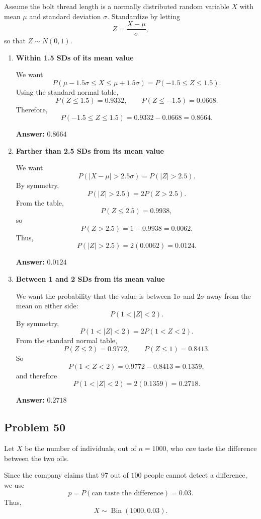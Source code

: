 \documentclass[11pt]{article}
\begin{document}
Assume the bolt thread length is a normally distributed random variable $X$ with mean $\mu$ and standard deviation $\sigma$. Standardize by letting
\[
Z=\frac{X-\mu}{\sigma},
\]
so that $Z\sim N(0,1)$.

\begin{enumerate}
    \item[(a)] \textbf{Within 1.5 SDs of its mean value}

    We want
    \[
    P(\mu-1.5\sigma \le X \le \mu+1.5\sigma)
    =P(-1.5\le Z\le 1.5).
    \]
    Using the standard normal table,
    \[
    P(Z\le 1.5)=0.9332,\qquad P(Z\le -1.5)=0.0668.
    \]
    Therefore,
    \[
    P(-1.5\le Z\le 1.5)=0.9332-0.0668=0.8664.
    \]

    \textbf{Answer:} $0.8664$

    \item[(b)] \textbf{Farther than 2.5 SDs from its mean value}

    We want
    \[
    P(|X-\mu|>2.5\sigma)=P(|Z|>2.5).
    \]
    By symmetry,
    \[
    P(|Z|>2.5)=2P(Z>2.5).
    \]
    From the table,
    \[
    P(Z\le 2.5)=0.9938,
    \]
    so
    \[
    P(Z>2.5)=1-0.9938=0.0062.
    \]
    Thus,
    \[
    P(|Z|>2.5)=2(0.0062)=0.0124.
    \]

    \textbf{Answer:} $0.0124$

    \item[(c)] \textbf{Between 1 and 2 SDs from its mean value}

    We want the probability that the value is between $1\sigma$ and $2\sigma$ away from the mean on either side:
    \[
    P(1<|Z|<2).
    \]
    By symmetry,
    \[
    P(1<|Z|<2)=2P(1<Z<2).
    \]
    From the standard normal table,
    \[
    P(Z\le 2)=0.9772,\qquad P(Z\le 1)=0.8413.
    \]
    So
    \[
    P(1<Z<2)=0.9772-0.8413=0.1359,
    \]
    and therefore
    \[
    P(1<|Z|<2)=2(0.1359)=0.2718.
    \]

    \textbf{Answer:} $0.2718$
\end{enumerate}

\subsection*{Problem 50}

Let $X$ be the number of individuals, out of $n=1000$, who \emph{can} taste the difference between the two oils.

Since the company claims that $97$ out of $100$ people cannot detect a difference, we use
\[
p=P(\text{can taste the difference})=0.03.
\]
Thus,
\[
X\sim \operatorname{Bin}(1000,0.03).
\]
\end{document}

